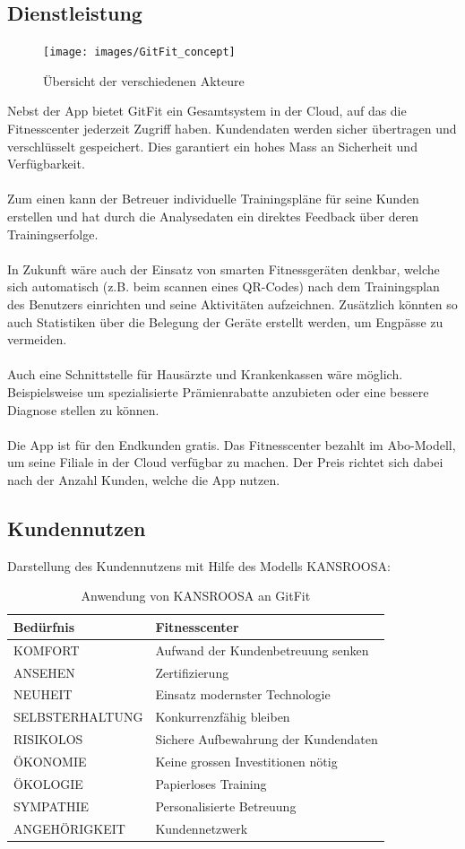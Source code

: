\subsection{Dienstleistung}
\begin{figure}[H]
	\centering
	\texttt{[image: images/GitFit\_concept]}
	\caption{Übersicht der verschiedenen Akteure}
	\label{fig:GitFit_concept}
\end{figure}
Nebst der App bietet GitFit ein Gesamtsystem in der Cloud, auf das die Fitnesscenter jederzeit Zugriff haben. Kundendaten werden sicher übertragen und verschlüsselt gespeichert. Dies garantiert ein hohes Mass an Sicherheit und Verfügbarkeit.  \\ \\
Zum einen kann der Betreuer individuelle Trainingspläne für seine Kunden erstellen und hat durch die Analysedaten ein direktes Feedback über deren Trainingserfolge. \\ \\
In Zukunft wäre auch der Einsatz von smarten Fitnessgeräten denkbar, welche sich automatisch (z.B. beim scannen eines QR-Codes) nach dem Trainingsplan des Benutzers einrichten und seine Aktivitäten aufzeichnen.
Zusätzlich könnten so auch Statistiken über die Belegung der Geräte erstellt werden, um Engpässe zu vermeiden. \\ \\
Auch eine Schnittstelle für Hausärzte und Krankenkassen wäre möglich. Beispielsweise um spezialisierte Prämienrabatte anzubieten oder eine bessere Diagnose stellen zu können. \\ \\
Die App ist für den Endkunden gratis. Das Fitnesscenter bezahlt im Abo-Modell, um seine Filiale in der Cloud verfügbar zu machen. Der Preis richtet sich dabei nach der Anzahl Kunden, welche die App nutzen.
\pagebreak
\subsection{Kundennutzen}\label{sec:kundennutzen}
Darstellung des Kundennutzens mit Hilfe des Modells KANSROOSA:
\begin{table}[H]
	\centering
	\begin{tabu} to \linewidth {l l}
		\toprule 
		Bedürfnis & Fitnesscenter \\
		\midrule
		KOMFORT & Aufwand der Kundenbetreuung senken \\
		ANSEHEN & Zertifizierung \\
		NEUHEIT & Einsatz modernster Technologie \\
		SELBSTERHALTUNG & Konkurrenzfähig bleiben \\
		RISIKOLOS & Sichere Aufbewahrung der Kundendaten \\
		ÖKONOMIE & Keine grossen Investitionen nötig \\
		ÖKOLOGIE & Papierloses Training \\
		SYMPATHIE & Personalisierte Betreuung \\
		ANGEHÖRIGKEIT & Kundennetzwerk \\
		\bottomrule 
	\end{tabu} 
	\caption{Anwendung von KANSROOSA an GitFit}
\end{table}


